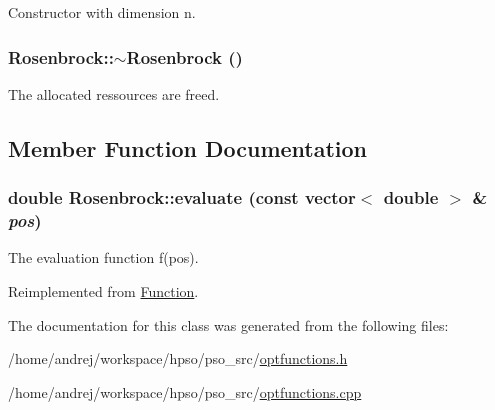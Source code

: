 Constructor with dimension n. 

\hypertarget{classRosenbrock_41def89ef4fbd061d40bb4b1a3ee2423}{
\subsubsection{\setlength{\rightskip}{0pt plus 5cm}Rosenbrock::$\sim$Rosenbrock ()}}
\label{classRosenbrock_41def89ef4fbd061d40bb4b1a3ee2423}


The allocated ressources are freed. 



\subsection{Member Function Documentation}
\hypertarget{classRosenbrock_2f19302aa06dd22a427291ed3af6ce1c}{
\subsubsection{\setlength{\rightskip}{0pt plus 5cm}double Rosenbrock::evaluate (const vector$<$ double $>$ \& {\em pos})}}
\label{classRosenbrock_2f19302aa06dd22a427291ed3af6ce1c}


The evaluation function f(pos). 



Reimplemented from \hyperlink{classFunction_159260a1fc3afa8932491e4057b6b844}{Function}.

The documentation for this class was generated from the following files:\begin{CompactItemize}
\item 
/home/andrej/workspace/hpso/pso\_\-src/\hyperlink{optfunctions_8h}{optfunctions.h}\item 
/home/andrej/workspace/hpso/pso\_\-src/\hyperlink{optfunctions_8cpp}{optfunctions.cpp}\end{CompactItemize}
